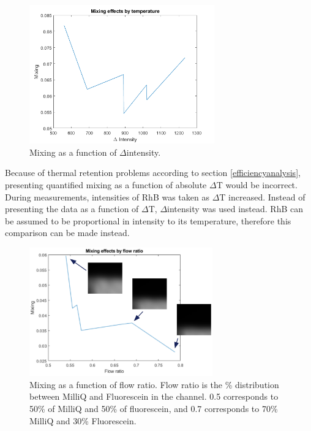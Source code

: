 \documentclass[twoside,twocolumn,9pt,a4paper]{IEEEtran}
\begin{document}
\begin{figure}[H]
\begin{center}
\includegraphics[width=8cm]{Images/Images from Jonte/Mixing effects by temperature.png} %
\caption{Mixing as a function of \(\Delta\)intensity.}
\label{Temperature}
\end{center}
\end{figure} %

Because of thermal retention problems according to section \ref{efficiencyanalysis}, presenting quantified mixing as a function of absolute \(\Delta\)T would be incorrect. During measurements, intensities of RhB was taken as \(\Delta\)T increased. Instead of presenting the data as a function of \(\Delta\)T, \(\Delta\)intensity was used instead. RhB can be assumed to be proportional in intensity to its temperature, therefore this comparison can be made instead. \cite{Corato}

\begin{figure}[H]
\begin{center}
\includegraphics[width=7.9cm]{Images/Images from Jonte/Mixing effects by flow ratio.png} %
\caption{Mixing as a function of flow ratio. Flow ratio is the \% distribution between MilliQ and Fluorescein in the channel. 0.5 corresponds to 50\% of MilliQ and 50\% of fluorescein, and 0.7 corresponds to 70\% MilliQ and 30\% Fluorescein.}
\label{FlowRatio}
\end{center}
\end{figure} %
\end{document}
